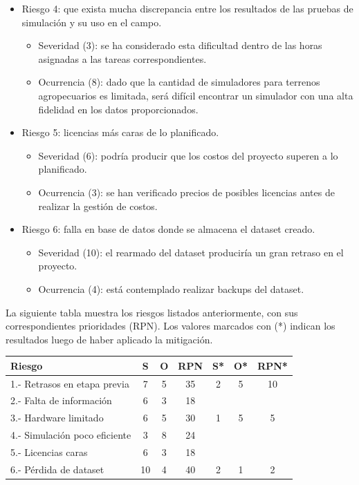 \documentclass[
11pt, %
]{charter}
\begin{document}
\begin{itemize}
	\item Riesgo 4: que exista mucha discrepancia entre los resultados de las pruebas de simulación y su uso en el campo.
	\begin{itemize}
		\item Severidad (3): se ha considerado esta dificultad dentro de las horas asignadas a las tareas correspondientes. 
		\item Ocurrencia (8): dado que la cantidad de simuladores para terrenos agropecuarios es limitada, será difícil encontrar un simulador con una alta fidelidad en los datos proporcionados.
	\end{itemize}
	
	\item Riesgo 5: licencias más caras de lo planificado.
	\begin{itemize}
		\item Severidad (6): podría producir que los costos del proyecto superen a lo planificado.
		\item Ocurrencia (3): se han verificado precios de posibles licencias antes de realizar la gestión de costos.
	\end{itemize}
	
	\item Riesgo 6: falla en base de datos donde se almacena el dataset creado.
	\begin{itemize}
		\item Severidad (10): el rearmado del dataset produciría un gran retraso en el proyecto.
		\item Ocurrencia (4): está contemplado realizar backups del dataset.
	\end{itemize}

\end{itemize}
	
La siguiente tabla muestra los riesgos listados anteriormente, con sus correspondientes prioridades (RPN). Los valores marcados con (*) indican los resultados luego de haber aplicado la mitigación.

\begin{table}[htpb]
\centering
\begin{tabularx}{\linewidth}{@{}|X|c|c|c|c|c|c|@{}}
\hline
\rowcolor[HTML]{C0C0C0} 
Riesgo 						  & S  & O & RPN & S* & O* & RPN*	\\ \hline
1.- Retrasos en etapa previa  & 7  & 5 & 35  & 2 & 5 & 10		\\ \hline
2.- Falta de información 	  & 6  & 3 & 18  &   &   &		\\ \hline
3.- Hardware limitado 		  & 6  & 5 & 30  & 1 & 5 & 5 	\\ \hline
4.- Simulación poco eficiente & 3  & 8 & 24  &   &   &  	\\ \hline
5.- Licencias caras			  & 6  & 3 & 18  &   &   &  	\\ \hline
6.- Pérdida de dataset		  & 10 & 4 & 40  & 2 & 1 & 2  	\\ \hline
\end{tabularx}%
\end{table}
\end{document}
